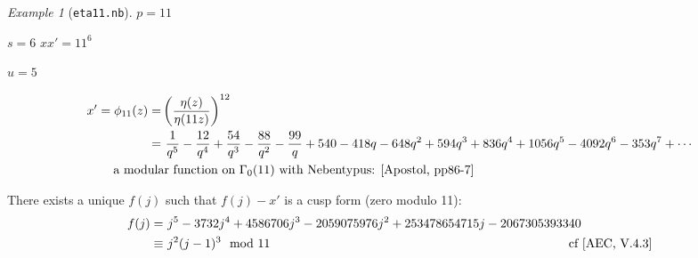 \documentclass{rs}
\theoremstyle{definition}
\theoremstyle{remark}
\newtheorem{ex}[thm]{Example}
\newcommand{\md}{~~{\rm mod}~}
\newcommand{\G}{\Gamma}
\renewcommand{\=}{\approx}
\renewcommand{\-}{\sim}
\numberwithin{equation}{section}
\numberwithin{thm}{section}
\begin{document}
\begin{ex}[\texttt{eta11.nb}]
 $p = 11$ 

 $s = 6$ \qquad $x x' = 11^6$ 

 $u = 5$ 

 \begin{equation*}
  \begin{split}
   x' = \phi_{11}(z) = & \left( \frac{\eta(z)}{\eta(11 z)} \right)^{12} \\
                     = & ~ \frac{1}{q^5} - \frac{12}{q^4} + \frac{54}{q^3} - \frac{88}{q^2} - \frac{99}{q} + 540 - 418 q - 648 q^2 + 594 q^3 + 836 q^4 + 1056 q^5 - 4092 q^6 - 353 q^7 + \cdots \\
                       & \hskip -1.35cm \text{a modular function on $\G_0(11)$ with Nebentypus: [Apostol, pp86-7]} 
  \end{split}
 \end{equation*}

 There exists a unique $f(j)$ such that $f(j) - x'$ is a cusp form (zero modulo 11): 
 \begin{equation*}
  \begin{split}
   f(j) = & ~ j^5 - 3732 j^4 + 4586706 j^3 - 2059075976 j^2 + 253478654715 j - 2067305393340 \\
   \equiv & ~ j^2 (j - 1)^3 \md 11 \qquad\qquad\qquad\qquad\qquad\qquad\qquad\qquad\qquad\qquad\qquad\qquad \text{cf [AEC, V.4.3]} 
  \end{split}
 \end{equation*}


\end{ex}
\end{document}
